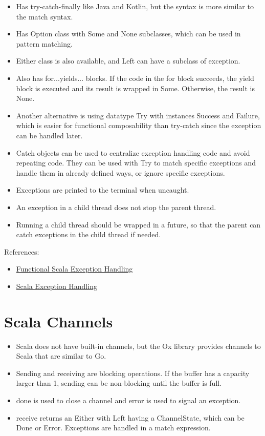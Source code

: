 \documentclass[a4paper,11pt]{article}
\theoremstyle{plain}
\theoremstyle{nonumberplain}
\begin{document}
\begin{itemize}
  \item Has try-catch-finally like Java and Kotlin, but the syntax is more similar to the match syntax.
  \item Has Option class with Some and None subclasses, which can be used in pattern matching.
  \item Either class is also available, and Left can have a subclass of exception.
  \item Also has for...yields... blocks. If the code in the for block succeeds, the yield block is executed and its result is wrapped in Some. Otherwise, the result is None.
  \item Another alternative is using datatype Try with instances Success and Failure, which is easier for functional composability than try-catch since the exception can be handled later.
  \item Catch objects can be used to centralize exception handling code and avoid repeating code. They can be used with Try to match specific exceptions and handle them in already defined ways, or ignore specific exceptions.
  \item Exceptions are printed to the terminal when uncaught.
  \item An exception in a child thread does not stop the parent thread.
  \item Running a child thread should be wrapped in a future, so that the parent can catch exceptions in the child thread if needed.
\end{itemize}

References:

\begin{itemize}
  \item \href{https://docs.scala-lang.org/scala3/book/fp-functional-error-handling.html}{Functional Scala Exception Handling}
  \item \href{https://www.baeldung.com/scala/exception-handling}{Scala Exception Handling}
\end{itemize}

\section{Scala Channels}

\begin{itemize}
  \item Scala does not have built-in channels, but the Ox library provides channels to Scala that are similar to Go.
  \item Sending and receiving are blocking operations. If the buffer has a capacity larger than 1, sending can be non-blocking until the buffer is full.
  \item done is used to close a channel and error is used to signal an exception.
  \item receive returns an Either with Left having a ChannelState, which can be Done or Error. Exceptions are handled in a match expression.
\end{itemize}
\end{document}
